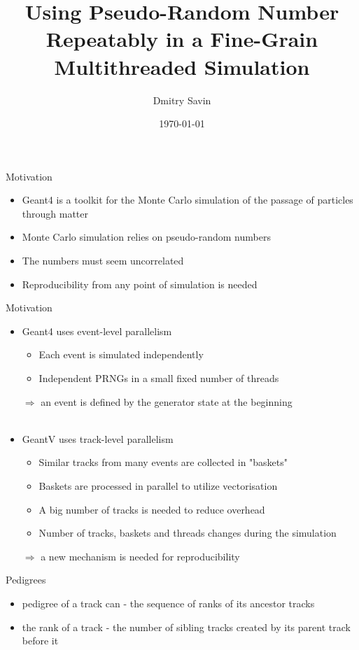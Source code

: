 \documentclass[aspectratio=169, 14pt]{beamer}
\title{Using Pseudo-Random Number Repeatably in a Fine-Grain Multithreaded Simulation}
\author{Dmitry Savin}
\date{\today}
\begin{document}
\begin{large}

 \frame{\titlepage}


 \begin{frame}{Motivation}
 \large
  \begin{itemize}
   \item Geant4 is a toolkit for the Monte Carlo simulation of the passage of particles through matter
   \item Monte Carlo simulation relies on pseudo-random numbers
   \item The numbers must seem uncorrelated
   \item Reproducibility from any point of simulation is needed
  \end{itemize}
 \end{frame}
 
  \begin{frame}{Motivation}
  \large
  \begin{itemize}
   \item Geant4 uses event-level parallelism
   \begin{itemize}
     \item Each event is simulated independently
     \item Independent PRNGs in a small fixed number of threads
    \end{itemize}
    $\Rightarrow$ an event is defined by the generator state at the beginning\\ \ \\
   \item GeantV uses track-level parallelism
    \begin{itemize}
     \item Similar tracks from many events are collected in "baskets"
     \item Baskets are processed in parallel to utilize vectorisation
     \item A big number of tracks is needed to reduce overhead
     \item Number of tracks, baskets and threads changes during the simulation
    \end{itemize}
   $\Rightarrow$ a new mechanism is needed for reproducibility
  \end{itemize}

 \end{frame}

 
 \begin{frame}{Pedigrees}
  \begin{itemize}
   \item pedigree of a track can - the sequence of ranks of its ancestor tracks
   \item the rank of a track - the number of sibling tracks created by its parent track before it
   


\end{itemize}
\end{frame}
\end{large}
\end{document}
